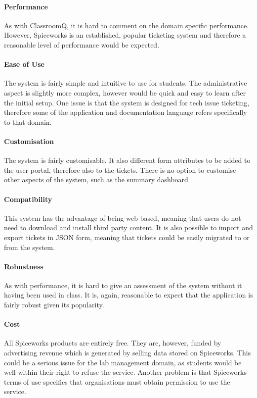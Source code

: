 \paragraph{Performance}
As with ClassroomQ, it is hard to comment on the domain specific performance. However, Spiceworks is an established, popular ticketing system and therefore a reasonable level of performance would be expected. 


\paragraph{Ease of Use} 

The system is fairly simple and intuitive to use for students. The administrative aspect is slightly more complex, however would be quick and easy to learn after the initial setup. One issue is that the system is designed for tech issue ticketing, therefore some of the application and documentation language refers specifically to that domain.

\paragraph{Customisation} 

The system is fairly customisable. It also different form attributes to be added to the user portal, therefore also to the tickets. There is no option to customise other aspects of the system, such as the summary dashboard


\paragraph{Compatibility}  

This system has the advantage of being web based, meaning that users do not need to download and install third party content. It is also possible to import and export tickets in JSON form, meaning that tickets could be easily migrated to or from the system.

\paragraph{Robustness}
As with performance, it is hard to give an assessment of the system without it having been used in class. It is, again, reasonable to expect that the application is fairly robust given its popularity.


\paragraph{Cost}  
All Spiceworks products are entirely free. They are, however, funded by advertising revenue which is generated by selling data stored on Spiceworks. This could be a serious issue for the lab management domain, as students would be well within their right to refuse the service. Another problem is that Spiceworks terms of use specifies that organisations must obtain permission to use the service.


